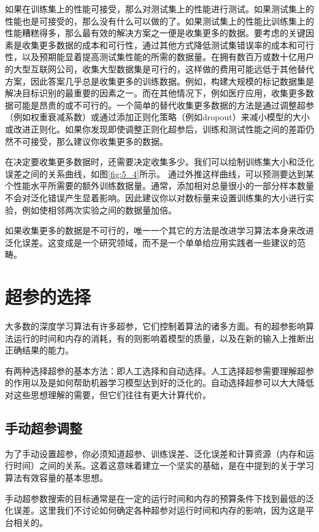 如果在训练集上的性能可接受，那么对测试集上的性能进行测试。如果测试集上的性能也是可接受的，那么没有什么可以做的了。如果测试集上的性能比训练集上的性能糟糕得多，那么最有效的解决方案之一便是收集更多的数据。要考虑的关键因素是收集更多数据的成本和可行性，通过其他方式降低测试集错误率的成本和可行性，以及预期能显着提高测试集性能的所需的数据量。在拥有数百万或数十亿用户的大型互联网公司，收集大型数据集是可行的，这样做的费用可能远低于其他替代方案，因此答案几乎总是收集更多的训练数据。例如，构建大规模的标记数据集是解决目标识别的最重要的因素之一。而在其他情况下，例如医疗应用，收集更多数据可能是昂贵的或不可行的。一个简单的替代收集更多数据的方法是通过调整超参（例如权重衰减系数）或通过添加正则化策略（例如dropout）来减小模型的大小或改进正则化。如果你发现即使调整正则化超参后，训练和测试性能之间的差距仍然不可接受，那么建议你收集更多的数据。

在决定要收集更多数据时，还需要决定收集多少。我们可以绘制训练集大小和泛化误差之间的关系曲线，如图\ref{fig:5_4}所示。 通过外推这样曲线，可以预测要达到某个性能水平所需要的额外训练数据量。通常，添加相对总量很小的一部分样本数量不会对泛化错误产生显着影响。因此建议你以对数标量来设置训练集的大小进行实验，例如使相邻两次实验之间的数据量加倍。

如果收集更多的数据是不可行的，唯一一个其它的方法是改进学习算法本身来改进泛化误差。这变成是一个研究领域，而不是一个单单给应用实践者一些建议的范畴。

\section{超参的选择}
\label{sec:11.4}

大多数的深度学习算法有许多超参，它们控制着算法的诸多方面。有的超参影响算法运行的时间和内存的消耗，有的则影响着模型的质量，以及在新的输入上推断出正确结果的能力。

有两种选择超参的基本方法：即人工选择和自动选择。人工选择超参需要理解超参的作用以及是如何帮助机器学习模型达到好的泛化的。自动选择超参可以大大降低对这些思想理解的需要，但它们往往有更大计算代价。


\subsection{手动超参调整}
\label{sec:11.4.1}

为了手动设置超参，你必须知道超参、训练误差、泛化误差和计算资源（内存和运行时间）之间的关系。这着这意味着建立一个坚实的基础，是在中提到的关于学习算法有效容量的基本思想。

手动超参数搜索的目标通常是在一定的运行时间和内存的预算条件下找到最低的泛化误差。这里我们不讨论如何确定各种超参对运行时间和内存的影响，因为这是平台相关的。

